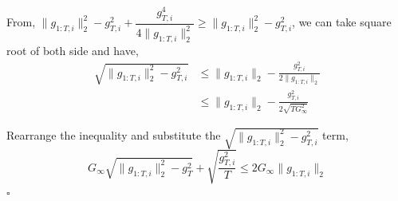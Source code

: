 \documentclass[11pt]{article}
\begin{document}
\noindent
From,
$\|g_{1:T,i}\|_2^2 - g_{T,i}^2 + \dfrac{g_{T,i}^4}{4\|g_{1:T,i}\|_2^2}
 \geq \|g_{1:T,i}\|_2^2 - g_{T,i}^2$,
we can take square root of both side and have,
\begin{align*}
\sqrt{\|g_{1:T,i}\|_2^2 - g_{T,i}^2}
 &\leq \|g_{1:T,i}\|_2 - \frac{g_{T,i}^2}{2 \|g_{1:T,i}\|_2} \\
 &\leq \|g_{1:T,i}\|_2 - \frac{g_{T,i}^2}{2 \sqrt{T G_\infty^2}}
\end{align*}

\noindent
Rearrange the inequality and substitute the
$\sqrt{\|g_{1:T,i}\|_2^2 - g_{T,i}^2}$ term,
\[
G_\infty \sqrt{\|g_{1:T,i}\|_2^2 - g_T^2}
 + \sqrt{\frac{g_{T,i}^2}{T}}
 \leq 2 G_\infty \|g_{1:T,i}\|_2
\]
\hfill$\square$

\end{document}
